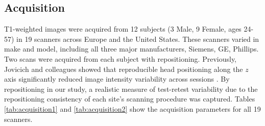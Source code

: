 \subsection{Acquisition}
T1-weighted images were acquired from 12 subjects (3 Male, 9 Female, ages 24-57) in 19 scanners across Europe and the United States. These scanners varied in make and model, including all three major manufacturers, Siemens, GE, Phillips. Two scans were acquired from each subject with repositioning. Previously, Jovicich and colleagues showed that reproducible head positioning along the $z$ axis significantly reduced image intensity variability across sessions \cite{freesurferReliability}. By repositioning in our study, a realistic measure of test-retest variability due to the repositioning consistency of each site's scanning procedure was captured. Tables \ref{tab:acquisition1} and \ref{tab:acquisition2} show the acquisition parameters for all 19 scanners.